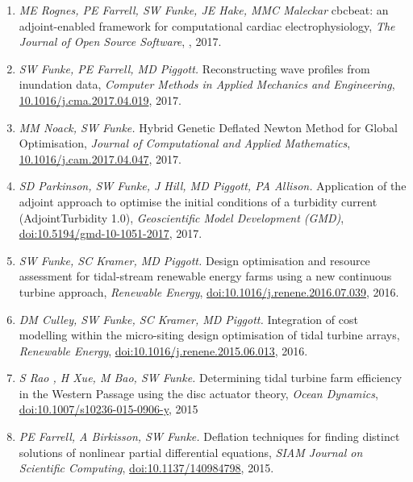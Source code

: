 \documentclass[11pt]{article}
\begin{document}
\begin{enumerate}
    \item \textit{ME Rognes, PE Farrell, SW Funke, JE Hake, MMC Maleckar} cbcbeat: an adjoint-enabled framework for computational cardiac electrophysiology, \textit{The Journal of Open Source Software}, \href{http://dx.doi.org/10.21105/joss.00224}, 2017.
    \item \textit{SW Funke, PE Farrell, MD Piggott.} Reconstructing wave profiles from inundation data, \textit{Computer Methods in Applied Mechanics and Engineering}, \href{https://doi.org/10.1016/j.cma.2017.04.019}{10.1016/j.cma.2017.04.019}, 2017.
    \item \textit{MM Noack, SW Funke.} Hybrid Genetic Deflated Newton Method for Global Optimisation, \textit{Journal of Computational and Applied Mathematics}, \href{http://dx.doi.org/10.1016/j.cam.2017.04.047}{10.1016/j.cam.2017.04.047}, 2017.
    \item \textit{SD Parkinson, SW Funke, J Hill, MD Piggott, PA Allison.} Application of the adjoint approach to optimise the initial conditions of a turbidity current (AdjointTurbidity 1.0), \textit{Geoscientific Model Development (GMD)}, \href{https://dx.doi.org/10.5194/gmd-10-1051-2017}{doi:10.5194/gmd-10-1051-2017}, 2017.
    \item \textit{SW Funke, SC Kramer, MD Piggott.} Design optimisation and resource assessment for tidal-stream renewable energy farms using a new continuous turbine approach, \textit{Renewable Energy}, \href{https://dx.doi.org/10.1016/j.renene.2016.07.039}{doi:10.1016/j.renene.2016.07.039}, 2016.
    \item \textit{DM Culley, SW Funke, SC Kramer, MD Piggott.} Integration of cost modelling within the micro-siting design optimisation of tidal turbine arrays, \textit{Renewable Energy}, \href{https://doi.org/10.1016/j.renene.2015.06.013}{doi:10.1016/j.renene.2015.06.013}, 2016.
    \item \textit{S Rao , H Xue, M Bao, SW Funke.} Determining tidal turbine farm efficiency in the Western Passage using the disc actuator theory, \textit{Ocean Dynamics}, \href{https://doi.org/10.1007/s10236-015-0906-y}{doi:10.1007/s10236-015-0906-y}, 2015
\item \textit{PE Farrell, A Birkisson, SW Funke.} Deflation techniques for finding distinct solutions of nonlinear partial differential equations, \textit{SIAM Journal on Scientific Computing}, \href{https://doi.org/10.1137/140984798}{doi:10.1137/140984798}, 2015.

\end{enumerate}
\end{document}

